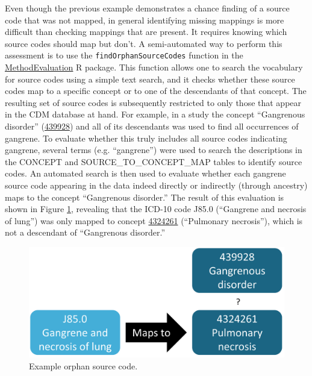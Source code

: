 \documentclass[11pt]{book}
\theoremstyle{definition}
\theoremstyle{definition}
\theoremstyle{definition}
\theoremstyle{remark}
\begin{document}
Even though the previous example demonstrates a chance finding of a
source code that was not mapped, in general identifying missing mappings
is more difficult than checking mappings that are present. It requires
knowing which source codes should map but don't. A semi-automated way to
perform this assessment is to use the \texttt{findOrphanSourceCodes}
function in the
\href{https://ohdsi.github.io/MethodEvaluation/}{MethodEvaluation} R
package. This function allows one to search the vocabulary for source
codes using a simple text search, and it checks whether these source
codes map to a specific concept or to one of the descendants of that
concept. The resulting set of source codes is subsequently restricted to
only those that appear in the CDM database at hand. For example, in a
study the concept ``Gangrenous disorder''
(\href{http://athena.ohdsi.org/search-terms/terms/439928}{439928}) and
all of its descendants was used to find all occurrences of gangrene. To
evaluate whether this truly includes all source codes indicating
gangrene, several terms (e.g. ``gangrene'') were used to search the
descriptions in the CONCEPT and SOURCE\_TO\_CONCEPT\_MAP tables to
identify source codes. An automated search is then used to evaluate
whether each gangrene source code appearing in the data indeed directly
or indirectly (through ancestry) maps to the concept ``Gangrenous
disorder.'' The result of this evaluation is shown in Figure
\ref{fig:missingMapping}, revealing that the ICD-10 code J85.0
(``Gangrene and necrosis of lung'') was only mapped to concept
\href{http://athena.ohdsi.org/search-terms/terms/4324261}{4324261}
(``Pulmonary necrosis''), which is not a descendant of ``Gangrenous
disorder.'' 

\begin{figure}

{\centering \includegraphics[width=0.7\linewidth]{images/DataQuality/missingMapping} 

}

\caption{Example orphan source code. }\label{fig:missingMapping}
\end{figure}
\end{document}
